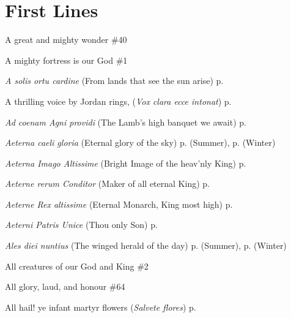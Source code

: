 {}
\fancyhead[RO,LE]{}
\fancyhead[RE,LO]{}

\section*{First Lines}

\small

\begin{hangparas}{1.25em}{1}
\par\noindent
A great and mighty wonder \dotfill \#40
\par\noindent
A mighty fortress is our God \dotfill \#1
\par\noindent
\textit{A solis ortu cardine} (From lands that see the sun arise) \dotfill p. \pageref{ChristmasMattins}
\par\noindent
A thrilling voice by Jordan rings, (\textit{Vox clara ecce intonat}) \dotfill p. \pageref{FirstAdventMattins}
\par\noindent
\textit{Ad coenam Agni providi} (The Lamb's high banquet we await) \dotfill p. \pageref{EasterEvensong}
\par\noindent
\textit{Aeterna caeli gloria} (Eternal glory of the sky) \dotfill p. \pageref{FridayMattinsSummer} (Summer), p. \pageref{FridayMattinsWinter} (Winter)
\par\noindent
\textit{Aeterna Imago Altissime} (Bright Image of the heav'nly King) \dotfill p. \pageref{ChristTheKingInvitatory}
\par\noindent
\textit{Aeterne rerum Conditor} (Maker of all eternal King) \dotfill p. \pageref{SundayMattinsWinter}
\par\noindent
\textit{Aeterne Rex altissime} (Eternal Monarch, King most high) \dotfill p. \pageref{AscensionInvitatory}
\par\noindent
\textit{Aeterni Patris Unice} (Thou only Son) \dotfill p. \pageref{MaryMagdaleneMattins}
\par\noindent
\textit{Ales diei nuntius} (The winged herald of the day) \dotfill p. \pageref{TuesdayMattinsSummer} (Summer), p. \pageref{TuesdayMattinsWinter} (Winter)
\par\noindent
All creatures of our God and King \dotfill \#2
\par\noindent
All glory, laud, and honour \dotfill \#64
\par\noindent
All hail! ye infant martyr flowers (\textit{Salvete flores}) \dotfill p. \pageref{HolyInnocentsMattins}

\end{hangparas}
